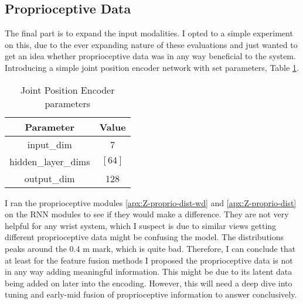 \subsection{Proprioceptive Data}
The final part is to expand the input modalities. I opted to a simple experiment on this, due to the ever expanding nature of these evaluations and just wanted to get an idea whether proprioceptive data was in any way beneficial to the system. Introducing a simple joint position encoder network with set parameters, Table \ref{tab:jp-enc-params}. 

\begin{table}[ht]
\centering
  \begin{tabular}{|| c | c ||}
    \hline
    Parameter & Value \\
    \hline
    input\_dim & 7 \\
    \hline
    hidden\_layer\_dims & \(\left[64\right]\) \\
    output\_dim & 128 \\
    \hline
  \end{tabular}\caption{Joint Position Encoder parameters}\label{tab:jp-enc-params}
\end{table}

I ran the proprioceptive modules \ref{apx:Z-proprio-dist-wd} and \ref{apx:Z-proprio-dist} on the RNN modules to see if they would make a difference. They are not very helpful for any wrist system, which I suspect is due to similar views getting different proprioceptive data might be confusing the model.  The distributions peaks around the 0.4 m mark, which is quite bad. Therefore, I can conclude that at least for the feature fusion methods I proposed the proprioceptive data is not in any way adding meaningful information. This might be due to its latent data being added on later into the encoding. However, this will need a deep dive into tuning and early-mid fusion of proprioceptive information to answer conclusively.
